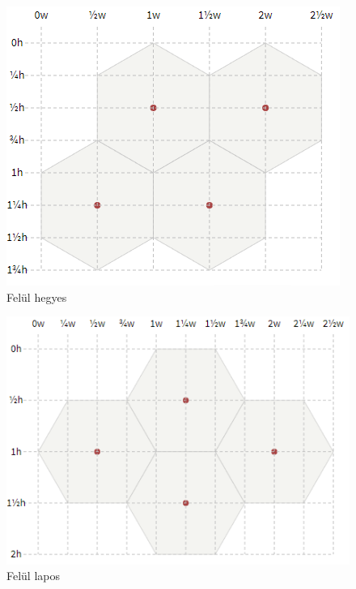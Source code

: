 \begin{figure}[h]
\centering
\includegraphics[scale=0.5]{kepek/img61.png}
\caption{Felül hegyes}
\label{fig:img61}
\end{figure}

\begin{figure}[h]
\centering
\includegraphics[scale=0.5]{kepek/img62.png}
\caption{Felül lapos}
\label{fig:img62}
\end{figure}

